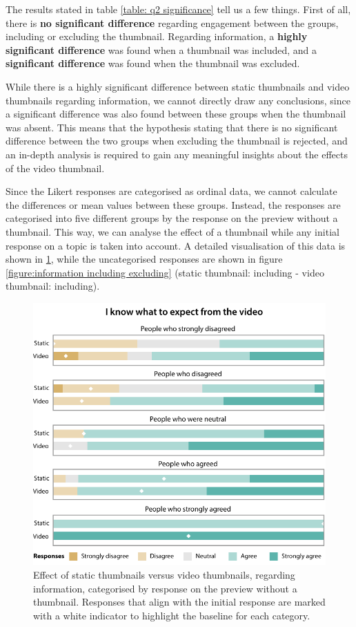 \documentclass{../resources/sig-alternate-05-2015}
\begin{document}
The results stated in table \ref{table: q2 significance} tell us a few things. First of all, there is \textbf{no significant difference} regarding engagement between the groups, including or excluding the thumbnail. Regarding information, a \textbf{highly significant difference} was found when a thumbnail was included, and a \textbf{significant difference} was found when the thumbnail was excluded.

While there is a highly significant difference between static thumbnails and video thumbnails regarding information, we cannot directly draw any conclusions, since a significant difference was also found between these groups when the thumbnail was absent. This means that the hypothesis stating that there is no significant difference between the two groups when excluding the thumbnail is rejected, and an in-depth analysis is required to gain any meaningful insights about the effects of the video thumbnail.

Since the Likert responses are categorised as ordinal data, we cannot calculate the differences or mean values between these groups. Instead, the responses are categorised into five different groups by the response on the preview without a thumbnail. This way, we can analyse the effect of a thumbnail while any initial response on a topic is taken into account. A detailed visualisation of this data is shown in \ref{figure:information static versus video}, while the uncategorised responses are shown in figure \ref{figure:information including excluding} (static thumbnail: including - video thumbnail: including).

\begin{figure}[h]
	\caption{Effect of static thumbnails versus video thumbnails, regarding information, categorised by response on the preview without a thumbnail. Responses that align with the initial response are marked with a white indicator to highlight the baseline for each category.}
	\label{figure:information static versus video}
	\includegraphics[width=\linewidth]{resources/information_static_video}
\end{figure}
\end{document}
